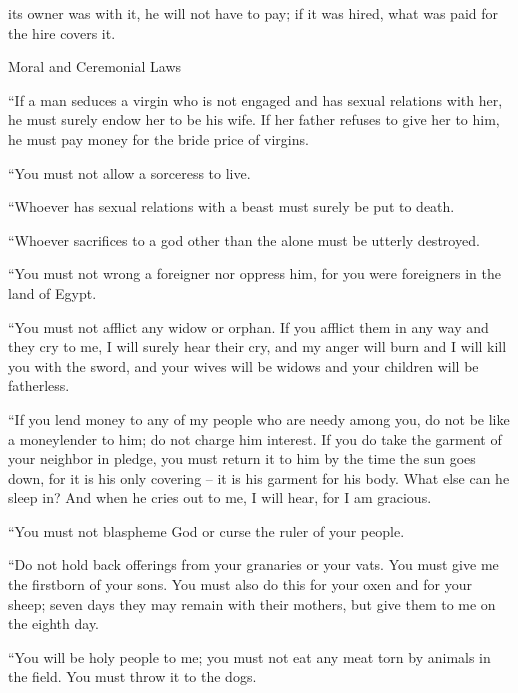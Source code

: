 {its owner
was with
it, he will not
have to pay;
if
it was hired,
what was paid
for the hire covers it.
\par }{\SH Moral and Ceremonial Laws
\par }{\PP {}“If
a man
seduces
a virgin
who
is not
engaged
and has sexual relations
with
her, he must surely endow
her to be his wife.
If
her
father
refuses
to give
her to him, he must pay
money
for the bride price
of virgins.
\par }{\PP {}“You must not
allow a sorceress
to live.
\par }{\PP {}“Whoever
has sexual
relations with
a beast
must surely be put to death.
\par }{\PP {}“Whoever sacrifices
to a god
other than
the {}
alone
must be utterly destroyed.
\par }{\PP {}“You must not wrong
a foreigner
nor
oppress
him, for
you were foreigners
in the land
of Egypt.
\par }{\PP {}“You must not
afflict
any
widow
or orphan.
If
you afflict
them in any way and they cry
to
me, I will surely hear
their cry,
and my anger
will burn
and I will kill
you with the sword,
and your wives
will be widows
and your children
will be fatherless.
\par }{\PP {}“If
you lend
money
to any of my people
who are needy
among you, do not
be like
a moneylender
to him; do not
charge
him interest.
If
you do take
the garment
of your neighbor
in pledge,
you must return
it to him by the time
the sun
goes down,
for
it is
his only
covering
– it is
his garment
for his body.
What
else can he sleep
in? And when
he cries out
to me,
I will hear,
for
I am
gracious.
\par }{\PP {}“You must not
blaspheme
God
or
curse
the ruler
of your people.
\par }{\PP {}“Do not
hold back
offerings from your granaries
or your vats.
You must give
me the firstborn
of your sons.
You must also do
this
for your oxen
and for your sheep;
seven
days
they may
remain with
their mothers,
but give
them to me on
the eighth
day.
\par }{\PP {}“You will be
holy
people
to me; you must not
eat
any meat
torn
by animals in the field.
You must throw
it to the dogs.


}

